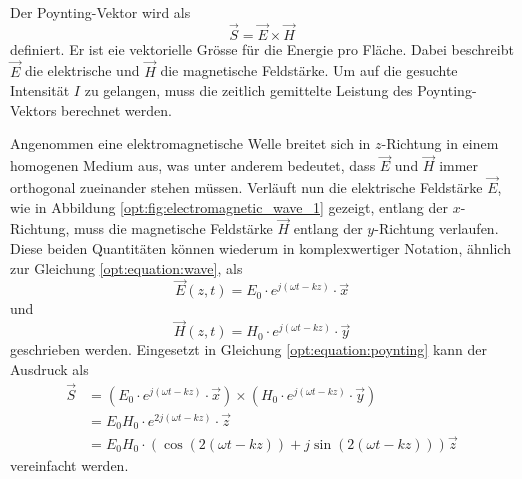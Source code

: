 Der Poynting-Vektor wird als
\begin{equation}
\vec{S} = \vec{E} \times \vec{H}
\label{opt:equation:poynting}
\end{equation}
definiert.
Er ist eie vektorielle Grösse für die Energie pro Fläche.
Dabei beschreibt $\vec{E}$ die elektrische und $\vec{H}$ die magnetische Feldstärke.
Um auf die gesuchte Intensität $I$ zu gelangen, muss die zeitlich gemittelte Leistung des Poynting-Vektors berechnet werden.

Angenommen eine elektromagnetische Welle breitet sich in $z$-Richtung in einem homogenen Medium aus, was unter anderem bedeutet, dass $\vec{E}$ und $\vec{H}$ immer orthogonal zueinander stehen müssen.
Verläuft nun die elektrische Feldstärke $\vec{E}$, wie in Abbildung \ref{opt:fig:electromagnetic_wave_1} gezeigt, entlang der $x$-Richtung, muss die magnetische Feldstärke $\vec{H}$ entlang der $y$-Richtung verlaufen.
Diese beiden Quantitäten können wiederum in komplexwertiger Notation, ähnlich zur Gleichung \eqref{opt:equation:wave}, als
\begin{equation}
\vec{E}(z,t)
=
E_0 \cdot e^{j(\omega t-k z)} \cdot \vec{x}
\label{opt:equation:wave_electric_field}
\end{equation}
und
\begin{equation}
\vec{H}(z,t)
=
H_0 \cdot e^{j(\omega t-k z)} \cdot \vec{y}
\label{opt:equation:wave_magnetic_field}
\end{equation}
geschrieben werden.
Eingesetzt in Gleichung \eqref{opt:equation:poynting} kann der Ausdruck als
\begin{align*}
\vec{S}
&=
\left(E_0 \cdot e^{j(\omega t-k z)} \cdot \vec{x}\right) \times \left(H_0 \cdot e^{j(\omega t-k z)} \cdot \vec{y}\right)
\\
&=
E_0 H_0 \cdot e^{2j(\omega t-k z)} \cdot \vec{z}
\\
&=
E_0 H_0 \cdot \left(\cos{(2(\omega t-kz))}+j\sin{(2(\omega t-kz))}\right) \vec{z}
\end{align*}
vereinfacht werden.

